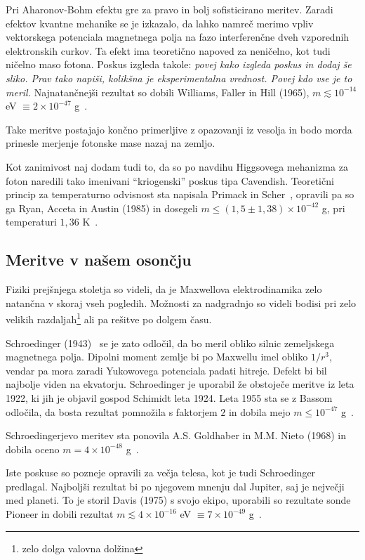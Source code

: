 \documentclass[a4paper, twocolumn, titlepage]{article}
\begin{document}
Pri Aharonov-Bohm efektu gre za pravo in bolj sofisticirano meritev. Zaradi efektov kvantne mehanike se je izkazalo, da lahko namreč merimo
vpliv vektorskega potenciala magnetnega polja na fazo interferenčne dveh vzporednih elektronskih curkov. Ta efekt ima teoretično napoved za
neničelno, kot tudi ničelno maso fotona. Poskus izgleda takole: \emph{povej kako izgleda poskus in dodaj še sliko. Prav tako napiši, kolikšna
je eksperimentalna vrednost. Povej kdo vse je to meril.} Najnatančnejši rezultat so dobili Williams, Faller in Hill (1965),
$m \lesssim 10^{-14}$ eV $\equiv 2\times 10^{-47}$ g~\cite{nieto2}.

Take meritve postajajo končno primerljive z opazovanji iz vesolja in
bodo morda prinesle merjenje fotonske mase nazaj na zemljo.

Kot zanimivost naj dodam tudi to, da so po navdihu Higgsovega mehanizma za foton naredili tako imenivani "`kriogenski"' poskus tipa Cavendish.
Teoretični princip za temperaturno odvisnost sta napisala Primack in Scher~\cite{nieto2},
opravili pa so ga Ryan, Acceta in Austin (1985) in dosegeli $m \leq (1,5 \pm 1,38) \times 10^{-42}$ g, pri temperaturi
$1,36$ K~\cite{over}.

\subsection{Meritve v našem osončju}

Fiziki prejšnjega stoletja so videli, da je Maxwellova elektrodinamika zelo natančna v skoraj vseh pogledih. Možnosti za nadgradnjo so videli
bodisi pri zelo velikih razdaljah\footnote{zelo dolga valovna dolžina} ali pa rešitve po dolgem času.

Schroedinger (1943)~\cite{nieto1} se je zato odločil, da bo meril obliko silnic zemeljskega magnetnega polja. Dipolni moment zemlje bi po
Maxwellu imel obliko $1/r^3$, vendar pa mora zaradi Yukowovega potenciala padati hitreje. Defekt bi bil najbolje viden na ekvatorju.
Schroedinger je uporabil že obstoječe meritve iz leta 1922, ki jih je objavil gospod Schimidt leta 1924. Leta 1955 sta se z Bassom odločila,
da bosta rezultat pomnožila s faktorjem $2$ in dobila mejo $m \leq 10^{-47}$ g~\cite{nieto1}.

Schroedingerjevo meritev sta ponovila A.S. Goldhaber in M.M. Nieto (1968) in dobila oceno $m = 4 \times 10^{-48}$ g~\cite{nieto1, over}.

Iste poskuse so pozneje opravili za večja telesa, kot je tudi Schroedinger predlagal. Najboljši rezultat bi po njegovem mnenju dal Jupiter,
saj je nejvečji med planeti. To je storil Davis (1975) s svojo ekipo, uporabili so rezultate sonde Pioneer in dobili rezultat
$m \lesssim 4\times10^{-16}$ eV $\equiv 7 \times 10^{-49}$ g~\cite{nieto2,over}.
\end{document}
